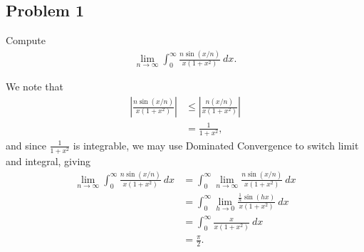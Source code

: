 \documentclass[10pt]{mypackage}
\begin{document}
\subsection{Problem 1}%
\begin{problem}
  Compute
  \begin{align*}
    \lim_{n\rightarrow\infty} \int_{0}^{\infty} \frac{n\sin\left( x/n \right)}{x\left( 1+x^2 \right)}\:dx.
  \end{align*}
\end{problem}
We note that
\begin{align*}
  \left\vert \frac{n\sin\left( x/n \right)}{x\left( 1+x^2 \right)}  \right\vert &\leq \left\vert \frac{n\left( x/n \right)}{x\left( 1+x^2 \right)} \right\vert\\
                                                                                &= \frac{1}{1+x^2},
\end{align*}
and since $\frac{1}{1+x^2}$ is integrable, we may use Dominated Convergence to switch limit and integral, giving
\begin{align*}
  \lim_{n\rightarrow\infty} \int_{0}^{\infty} \frac{n\sin\left( x/n \right)}{x\left( 1+x^2 \right)}\:dx &= \int_{0}^{\infty} \lim_{n\rightarrow\infty}\frac{n\sin\left( x/n \right)}{x\left( 1+x^2 \right)}\:dx\\
                                                                                                        &= \int_{0}^{\infty} \lim_{h\rightarrow 0} \frac{\frac{1}{h}\sin\left( hx \right)}{x\left( 1+x^2 \right)}\:dx\\
                                                                                                        &= \int_{0}^{\infty} \frac{x}{x\left( 1+x^2 \right)}\:dx\\
                                                                                                        &= \frac{\pi}{2}.
\end{align*}
\end{document}
